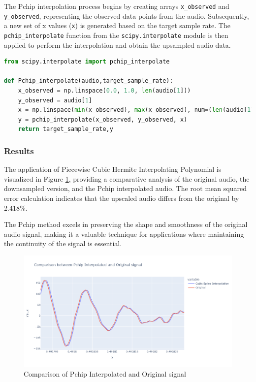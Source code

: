 \documentclass{article}
\begin{document}
The Pchip interpolation process begins by creating arrays \texttt{x\_observed} and \texttt{y\_observed}, representing the observed data points from the audio. Subsequently, a new set of x values (\texttt{x}) is generated based on the target sample rate. The \texttt{pchip\_interpolate} function from the \texttt{scipy.interpolate} module is then applied to perform the interpolation and obtain the upsampled audio data.



\begin{lstlisting}[language=Python, caption={Piecewise cubic Hermite interpolating polynomial Function}]
from scipy.interpolate import pchip_interpolate

def Pchip_interpolate(audio,target_sample_rate):
    x_observed = np.linspace(0.0, 1.0, len(audio[1]))
    y_observed = audio[1]
    x = np.linspace(min(x_observed), max(x_observed), num=(len(audio[1])*(target_sample_rate//audio[0])))
    y = pchip_interpolate(x_observed, y_observed, x)
    return target_sample_rate,y
\end{lstlisting} 

\subsubsection{Results}

The application of Piecewise Cubic Hermite Interpolating Polynomial is visualized in Figure \ref{fig:pchip}, providing a comparative analysis of the original audio, the downsampled version, and the Pchip interpolated audio. The root mean squared error calculation indicates that the upscaled audio differs from the original by 2.418\%. \cite{wiki_rmsd}

The Pchip method excels in preserving the shape and smoothness of the original audio signal, making it a valuable technique for applications where maintaining the continuity of the signal is essential.

\begin{figure}[h]
    \centering
    \includegraphics[width=\textwidth]{pchip.png}
    \caption{Comparison of Pchip Interpolated and Original signal}
    \label{fig:pchip}
\end{figure}
\end{document}
